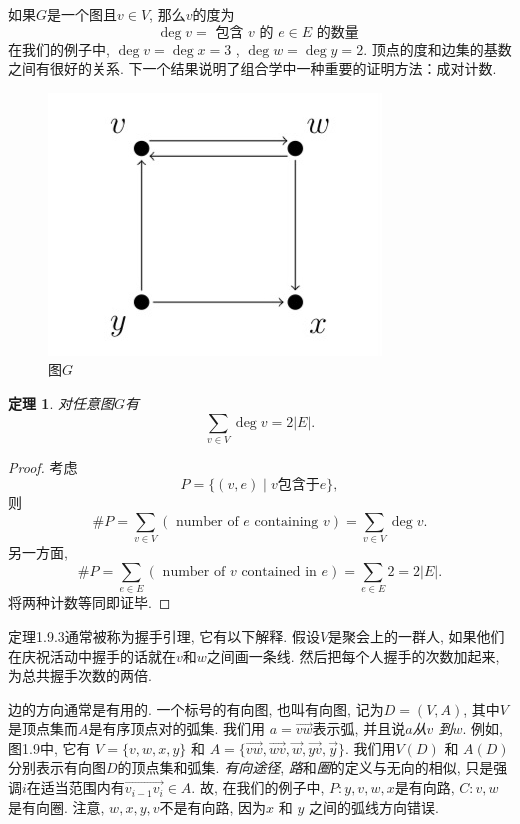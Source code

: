 \documentclass{ctexbook}
\newtheorem{thm}{定理}[section]
\begin{document}
如果$G$是一个图且$v \in V$, 那么$v$的度为
$$
\operatorname{deg} v=  \text { 包含 } v \text{ 的 } e \in E \text { 的数量 }
$$
在我们的例子中,  $\operatorname{deg} v=\operatorname{deg} x=3$ ,  $\operatorname{deg} w=\operatorname{deg} y=2$.
顶点的度和边集的基数之间有很好的关系. 下一个结果说明了组合学中一种重要的证明方法：成对计数.

\begin{figure}
    \centering
    \includegraphics[scale=0.3]{./fig1/figure1.9.PNG}
    \caption{图$G$}
\end{figure}

     \begin{thm}
    	对任意图$G$有
    	$$
    	\sum_{v \in V} \operatorname{deg} v=2|E|.
    	$$
    \end{thm}
    \begin{proof}
    	考虑
    	$$
    	P=\{(v, e) \mid v \text {包含于} e\},
    	$$
    	则
    	$$
    	\# P=\sum_{v \in V}(\text { number of } e \text { containing } v)=\sum_{v \in V} \operatorname{deg} v.
    	$$
    	另一方面,
    	$$
    	\# P=\sum_{e \in E}(\text { number of } v \text { contained in } e)=\sum_{e \in E} 2=2|E|.
    	$$
    	将两种计数等同即证毕.
    \end{proof}

定理1.9.3通常被称为握手引理, 它有以下解释. 假设$V$是聚会上的一群人, 如果他们在庆祝活动中握手的话就在$v$和$w$之间画一条线.
然后把每个人握手的次数加起来, 为总共握手次数的两倍.

边的方向通常是有用的. 一个标号的有向图, 也叫有向图, 记为$D=(V, A)$, 其中$V$是顶点集而$A$是有序顶点对的弧集. 我们用
$a=\overrightarrow{v w}$表示弧, 并且说$a$\textsl{从$v$ 到$w$}. 例如, 图1.9中, 它有
$V=\{v, w, x, y\}$ 和 $A=\{\overrightarrow{v w}, \overrightarrow{w v}, \vec{w}, \overrightarrow{y v}, \vec{y}\}$.
我们用$V(D)$ 和 $A(D)$分别表示有向图$D$的顶点集和弧集. \textsl{有向途径}, \textsl{路}和\textsl{圈}的定义与无向的相似,
只是强调$i$在适当范围内有$\overrightarrow{v_{i-1} v_{i}} \in A$. 故, 在我们的例子中, $P: y, v, w, x$是有向路, $C: v, w$是有向圈.
注意,  $w, x, y, v$不是有向路, 因为$x$ 和 $y$ 之间的弧线方向错误.
\end{document}
